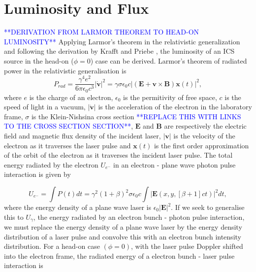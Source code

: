 \documentclass[../main.tex]{subfiles}
\begin{document}
\section{Luminosity and Flux}
\label{sec:luminosity_and_flux}
\textcolor{blue}{**DERIVATION FROM LARMOR THEOREM TO HEAD-ON LUMINOSITY**}
Applying Larmor's theorem \cite{larmor1897lxiii,purcell1965electricity} in the relativistic generalization \cite{jackson1999classical} and following the derivation by Krafft and Priebe \cite{krafft2010compton}, the luminosity of an ICS source in the head-on ($\phi=0$) case can be derived. Larmor's theorem of radiated power in the relativistic generalisation is 
\begin{equation}
P_{rad} = \frac{\gamma^{4}e^{2}}{6\pi \epsilon_{0}c^{3}}\lvert\mathbf{\dot{v}}\rvert^{2} = \gamma\sigma\epsilon_{0}c\lvert\left(\mathbf{E}+\mathbf{v}\times\mathbf{B}\right)\mathbf{x}\left(t\right)\rvert^{2},
\label{eq:larmor_formula}    
\end{equation}
where $e$ is the charge of an electron,  $\epsilon_{0}$ is the permitivity of free space, $c$ is the speed of light in a vacuum, $\lvert\mathbf{\dot{v}}\rvert$ is the acceleration of the electron in the laboratory frame, $\sigma$ is the Klein-Nishsina cross section \textcolor{blue}{**REPLACE THIS WITH LINKS TO THE CROSS SECTION SECTION**}, $\mathbf{E}$ and $\mathbf{B}$ are respectively the electric field and magnetic flux density of the incident laser, $\lvert\mathbf{v}\rvert$ is the velocity of the electron as it traverses the laser pulse and $\mathbf{x}\left(t\right)$ is the first order approximation of the orbit of the electron as it traverses the incident laser pulse. 
The total energy radiated by the electron $U_{e^{-}}$ in an electron - plane wave photon pulse interaction is given by \cite{krafft2010compton}

\begin{equation}
U_{e^{-}} = \int P\left(t\right)dt = \gamma^{2}\left(1+\beta\right)^{2}\sigma\epsilon_{0}c\int\lvert\mathbf{E}\left(x,y,\left[\beta+1\right]ct\right)\rvert^{2}dt,
\label{eq:electron_radiated_energy}
\end{equation}
where the energy density of a plane wave laser is $\epsilon_{0}\lvert\mathbf{E}\rvert^{2}$. If we seek to generalise this to $U_{\gamma}$, the energy radiated by an electron bunch - photon pulse interaction, we must replace the energy density of a plane wave laser by the energy density distribution of a laser pulse and convolve this with an electron bunch intensity distribution. For a head-on case $\left(\phi=0\right)$, with the laser pulse Doppler shifted into the electron frame, the radiated energy of a electron bunch - laser pulse interaction is    
\end{document}
